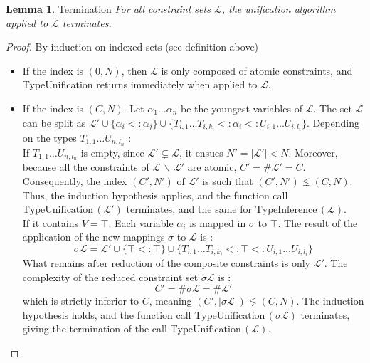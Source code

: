 \documentclass[10pt]{article}
\theoremstyle{plain}
\theoremstyle{definition}
\newtheorem{lemma}{Lemma}[section]
\begin{document}
\begin{lemma}{Termination}
	\textit{For all constraint sets $\mathcal{L}$, the unification algorithm applied to $\mathcal{L}$ terminates. }
	\begin{proof}
		By induction on indexed sets (see definition above)
		\begin{itemize}
			\item If the index is $(0, N)$, then $\mathcal{L}$ is only composed of atomic constraints, and TypeUnification returns
				immediately when applied to $\mathcal{L}$.
				
			\item If the index is $(C, N)$.
				Let $\alpha_1 \dots \alpha_n$ be the youngest variables of $\mathcal{L}$. The set $\mathcal{L}$ can
				be split as $\mathcal{L'} \cup \{\alpha_i <: \alpha_j \} \cup \{ T_{i, 1} \dots T_{i, k_i} <: \alpha_i <: U_{i, 1} \dots U_{i, l_i} \}$.
				Depending on the types $T_{1, 1} \dots U_{n, l_n}$ : \\

				If $T_{1, 1} \dots U_{n, l_n}$ is empty, since $\mathcal{L'} \subsetneq \mathcal{L}$, it ensues $N' = |\mathcal{L'}| < N$.
				Moreover, because all the constraints of $\mathcal{L} \,\backslash\, \mathcal{L'}$ are atomic, $C' = \#\mathcal{L'} = C$.
				Consequently, the index $(C', N')$ of $\mathcal{L'}$ is such that $(C', N') \lneq (C, N)$.
				Thus, the induction hypothesis applies, and the function call $\text{TypeUnification}\,(\mathcal{L'})$ terminates, and the same
				for $\text{TypeInference}\,(\mathcal{L})$. \\
							
				If it contains $V = \top$. Each variable $\alpha_i$ is mapped in $\sigma$ to $\top$.
				The result of the application of the new mappings $\sigma$ to $\mathcal{L}$ is :
			  	$$\sigma \mathcal{L} = \mathcal{L'} \cup \{\top <: \top\} \cup \{ T_{i, 1} \dots T_{i, k_i} <: \top <: U_{i, 1} \dots U_{i, l_i} \}$$
       	What remains after reduction of the composite constraints is only $\mathcal{L'}$.
       	The complexity of the reduced constraint set $\sigma \mathcal{L}$ is :
			  	$$C' = \#\sigma\mathcal{L} = \#\mathcal{L'} $$
			  which is strictly inferior to $C$, meaning $(C',|\sigma\mathcal{L}|) \lneq (C, N)$. The induction hypothesis holds, and the function
			  call $\text{TypeUnification}\,(\sigma \mathcal{L})$ terminates, giving the termination of the call
			  $\text{TypeUnification}\,(\mathcal{L})$. \\
							

\end{itemize}
\end{proof}
\end{lemma}
\end{document}
